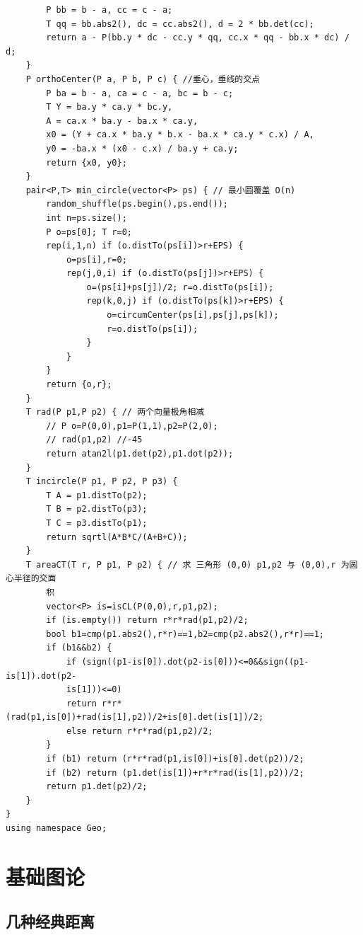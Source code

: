\documentclass[a4paper,12pt]{article}
\begin{document}
\begin{lstlisting}
        P bb = b - a, cc = c - a;
        T qq = bb.abs2(), dc = cc.abs2(), d = 2 * bb.det(cc);
        return a - P(bb.y * dc - cc.y * qq, cc.x * qq - bb.x * dc) / d;
    }
    P orthoCenter(P a, P b, P c) { //垂心，垂线的交点
        P ba = b - a, ca = c - a, bc = b - c;
        T Y = ba.y * ca.y * bc.y,
        A = ca.x * ba.y - ba.x * ca.y,
        x0 = (Y + ca.x * ba.y * b.x - ba.x * ca.y * c.x) / A,
        y0 = -ba.x * (x0 - c.x) / ba.y + ca.y;
        return {x0, y0};
    }
    pair<P,T> min_circle(vector<P> ps) { // 最小圆覆盖 O(n)
        random_shuffle(ps.begin(),ps.end());
        int n=ps.size();
        P o=ps[0]; T r=0;
        rep(i,1,n) if (o.distTo(ps[i])>r+EPS) {
            o=ps[i],r=0;
            rep(j,0,i) if (o.distTo(ps[j])>r+EPS) {
                o=(ps[i]+ps[j])/2; r=o.distTo(ps[i]);
                rep(k,0,j) if (o.distTo(ps[k])>r+EPS) {
                    o=circumCenter(ps[i],ps[j],ps[k]);
                    r=o.distTo(ps[i]);
                }
            }
        }
        return {o,r};
    }
    T rad(P p1,P p2) { // 两个向量极角相减
        // P o=P(0,0),p1=P(1,1),p2=P(2,0);
        // rad(p1,p2) //-45
        return atan2l(p1.det(p2),p1.dot(p2));
    }
    T incircle(P p1, P p2, P p3) {
        T A = p1.distTo(p2);
        T B = p2.distTo(p3);
        T C = p3.distTo(p1);
        return sqrtl(A*B*C/(A+B+C));
    }
    T areaCT(T r, P p1, P p2) { // 求 三角形 (0,0) p1,p2 与 (0,0),r 为圆心半径的交面
        积
        vector<P> is=isCL(P(0,0),r,p1,p2);
        if (is.empty()) return r*r*rad(p1,p2)/2;
        bool b1=cmp(p1.abs2(),r*r)==1,b2=cmp(p2.abs2(),r*r)==1;
        if (b1&&b2) {
            if (sign((p1-is[0]).dot(p2-is[0]))<=0&&sign((p1-is[1]).dot(p2-
            is[1]))<=0)
            return r*r*(rad(p1,is[0])+rad(is[1],p2))/2+is[0].det(is[1])/2;
            else return r*r*rad(p1,p2)/2;
        }
        if (b1) return (r*r*rad(p1,is[0])+is[0].det(p2))/2;
        if (b2) return (p1.det(is[1])+r*r*rad(is[1],p2))/2;
        return p1.det(p2)/2;
    }
}
using namespace Geo;
\end{lstlisting}

\newpage

\section{基础图论}

\subsection{几种经典距离}
\end{document}
